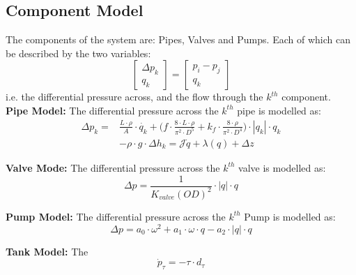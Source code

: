 \subsection{Component Model}
The components of the system are: Pipes, Valves and Pumps. Each of which can be described by the two variables:
\begin{equation*}
	\begin{bmatrix} \Delta{p_k}\\q_k\end{bmatrix}=\begin{bmatrix}
		p_i-p_j\\q_k
	\end{bmatrix}
\end{equation*}
i.e. the differential pressure across, and the flow through the $ k^{th} $ component.\\
\textbf{Pipe Model:}
The differential pressure across the $ k^{th} $ pipe is modelled as:
\begin{equation}
	\begin{split}
		\Delta{p_{k}} = &\frac{L\cdot \rho}{A}\cdot \dot{q_{k}}
		+\Big(f \cdot \frac{8\cdot L\cdot \rho}{\pi^{2} \cdot D^{5}} + k_{f}\cdot \frac{8\cdot \rho}{\pi^{2} \cdot D^{4}}\Big)\cdot |q_{k}|\cdot q_{k}\\
		&- \rho \cdot g \cdot \Delta{h_{k}} = \mathcal{J}\dot{q} + \lambda(q) + \Delta z
	\end{split}
\end{equation}

\textbf{Valve Mode:}
The differential pressure across the $ k^{th} $ valve is modelled as:
\begin{equation}
	\Delta p = \frac{1}{K_{valve}(OD)^2} \cdot |q|\cdot q
\end{equation}

\textbf{Pump Model:}
The differential pressure across the $ k^{th} $ Pump is modelled as:
\begin{equation}\label{eq:PumpPressure}
	\Delta p =   a_0\cdot \omega^2 +  a_1\cdot \omega \cdot q -a_2\cdot |q|\cdot q
\end{equation}

\textbf{Tank Model:} The 
\begin{equation} \label{eq:dpTank}
	\dot{p}_{\tau}=-\tau \cdot d_{\tau} 
\end{equation} 
